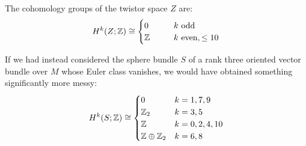 \begin{prop}
	The cohomology groups of the twistor space $Z$ are:
	\begin{equation*}
		H^k(Z;\mathbb{Z})\cong
		\begin{cases}
			0 \qquad &k\ \text{odd}\\
			\mathbb{Z} &k\ \text{even},\leq 10
		\end{cases}
	\end{equation*}
\end{prop}

\begin{rem}
	If we had instead considered the sphere bundle $S$ of a rank three oriented vector bundle over $M$ whose Euler class vanishes, we would have obtained something significantly more messy:
	\begin{equation*}
		H^k(S;\mathbb{Z})\cong
		\begin{cases}
			0\qquad & k=1,7,9\\
			\mathbb{Z}_2 &k=3,5\\
			\mathbb{Z} &k=0,2,4,10\\
			\mathbb{Z}\oplus\mathbb{Z}_2 &k=6,8
		\end{cases}
	\end{equation*}
\end{rem}

